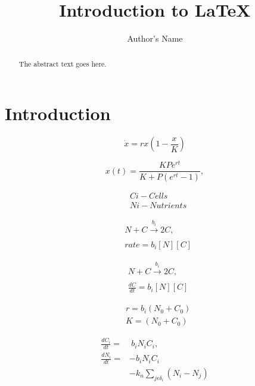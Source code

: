 \documentclass{article}
\begin{document}
\title{Introduction to \LaTeX{}}
\author{Author's Name}

\maketitle

\begin{abstract}
The abstract text goes here.
\end{abstract}

\section{Introduction}


\begin{equation}
\label{eq:1}
\dot{x} = rx\left(1 - \frac{x}{K}\right)
\end{equation}

\begin{equation}
\label{eq:2}
x(t) = \frac{KPe^{rt}}{K + P(e^{rt}-1)},
\end{equation}

\begin{subequations}
	\begin{align}
	&C{i} - Cells\\
	&N{i} - Nutrients
	\end{align}
\end{subequations}

\begin{subequations}
	\label{eq:9}
	\begin{align}
		&N + C \xrightarrow[]{b_{i}} 2C,\\
		&rate = b_{i}[N][C]
	\end{align}
\end{subequations}

\begin{subequations}
	\label{eq:9}
	\begin{align}
	&N + C \xrightarrow[]{b_{i}} 2C,\\
	&\frac{dC}{dt} = b_{i}[N][C]
	\end{align}
\end{subequations}

\begin{subequations}
	\label{eq:9}
	\begin{align}
	&r = b_{i}(N_0 + C_0)\\
	&K = (N_0 + C_0)
	\end{align}
\end{subequations}

\begin{subequations}
	\label{eq:5}
	\begin{align}
	\frac{dC_{i}}{dt} =&~b_{i}N_{i}C_{i},\\
	\frac{dN_{i}}{dt} =& - b_{i}N_{i}C_{i}\\
	 & - k_{n}\sum_{j \epsilon \delta_i}(N_{i} - N_{j})\\
	\end{align}
\end{subequations}
\end{document}
